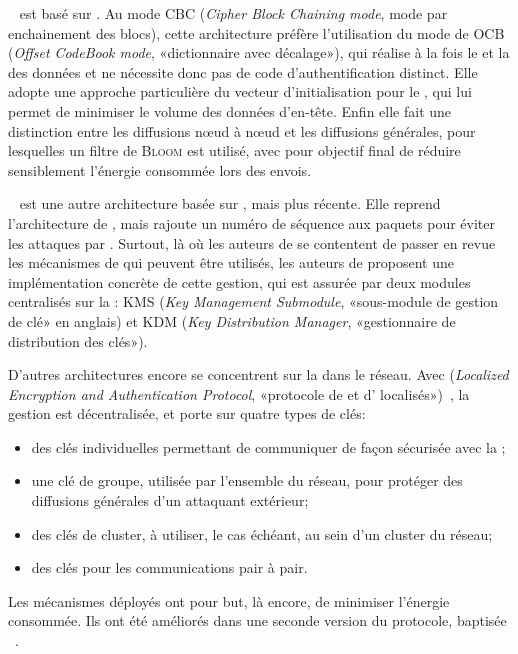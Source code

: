 ~\cite{LMPG07} est basé sur .
Au mode CBC (\textit{Cipher Block Chaining mode}, mode par enchainement des blocs), cette architecture préfère l'utilisation du mode de  OCB (\textit{Offset CodeBook mode}, «dictionnaire avec décalage»), qui réalise à la fois le  et la  des données et ne nécessite donc pas de code d'authentification distinct.
Elle adopte une approche particulière du vecteur d'initialisation pour le , qui lui permet de minimiser le volume des données d'en-tête.
Enfin elle fait une distinction entre les diffusions nœud à nœud et les diffusions générales, pour lesquelles un filtre de \textsc{Bloom} est utilisé, avec pour objectif final de réduire sensiblement l'énergie consommée lors des envois.

~\cite{CRS11} est une autre architecture basée sur , mais plus récente.
Elle reprend l'architecture de , mais rajoute un numéro de séquence aux paquets pour éviter les attaques par .
Surtout, là où les auteurs de  se contentent de passer en revue les mécanismes de  qui peuvent être utilisés, les auteurs de  proposent une implémentation concrète de cette gestion, qui est assurée par deux modules centralisés sur la \sdb: KMS (\textit{Key Management Submodule}, «sous-module de gestion de clé» en anglais) et KDM (\textit{Key Distribution Manager}, «gestionnaire de distribution des clés»).

D'autres architectures encore se concentrent sur la  dans le réseau.
Avec  (\textit{Localized Encryption and Authentication Protocol}, «protocole de  et d' localisés»)~\cite{ZSJ03}, la gestion est décentralisée, et porte sur quatre types de clés:
\begin{itemize}
    \item des clés individuelles permettant de communiquer de façon sécurisée avec la \sdb;
    \item une clé de groupe, utilisée par l'ensemble du réseau, pour protéger des diffusions générales d'un attaquant extérieur;
    \item des clés de cluster, à utiliser, le cas échéant, au sein d'un cluster du réseau;
    \item des clés pour les communications pair à pair.
\end{itemize}
Les mécanismes déployés ont pour but, là encore, de minimiser l'énergie consommée.
Ils ont été améliorés dans une seconde version du protocole, baptisée ~\cite{ZSJ06}.

